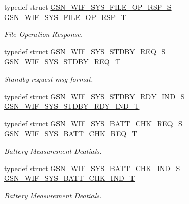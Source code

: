 \begin{DoxyCompactItemize}
typedef struct \hyperlink{a00351}{GSN\_\-WIF\_\-SYS\_\-FILE\_\-OP\_\-RSP\_\-S} \hyperlink{a00639_gace03eed872f0520e74fbcb1eb8faa065}{GSN\_\-WIF\_\-SYS\_\-FILE\_\-OP\_\-RSP\_\-T}
\begin{DoxyCompactList}\small\item\em File Operation Response. \end{DoxyCompactList}\item 
typedef struct \hyperlink{a00364}{GSN\_\-WIF\_\-SYS\_\-STDBY\_\-REQ\_\-S} \hyperlink{a00639_gac5574c4a3e73dabf551d5bdbe8a1c59e}{GSN\_\-WIF\_\-SYS\_\-STDBY\_\-REQ\_\-T}
\begin{DoxyCompactList}\small\item\em Standby request msg format. \end{DoxyCompactList}\item 
typedef struct \hyperlink{a00363}{GSN\_\-WIF\_\-SYS\_\-STDBY\_\-RDY\_\-IND\_\-S} \hyperlink{a00639_ga682020519e40d5d988f8edece8ec693c}{GSN\_\-WIF\_\-SYS\_\-STDBY\_\-RDY\_\-IND\_\-T}
\item 
typedef struct \hyperlink{a00346}{GSN\_\-WIF\_\-SYS\_\-BATT\_\-CHK\_\-REQ\_\-S} \hyperlink{a00639_ga5da12fbc2ff8e811daefb22efe2ea035}{GSN\_\-WIF\_\-SYS\_\-BATT\_\-CHK\_\-REQ\_\-T}
\begin{DoxyCompactList}\small\item\em Battery Measurement Deatials. \end{DoxyCompactList}\item 
typedef struct \hyperlink{a00345}{GSN\_\-WIF\_\-SYS\_\-BATT\_\-CHK\_\-IND\_\-S} \hyperlink{a00639_gad097596826952565d80cccae8d9f10c0}{GSN\_\-WIF\_\-SYS\_\-BATT\_\-CHK\_\-IND\_\-T}
\begin{DoxyCompactList}\small\item\em Battery Measurement Deatials. \end{DoxyCompactList}\end{DoxyCompactItemize}
